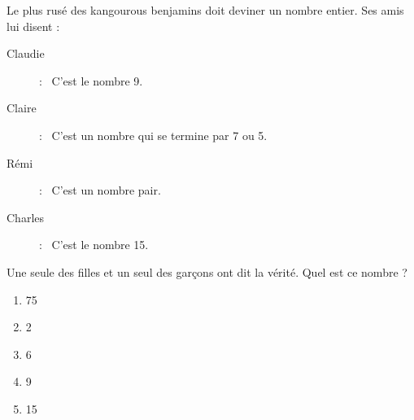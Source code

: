 Le plus rusé des kangourous benjamins doit deviner un nombre entier. Ses amis lui disent :
\begin{description}
\item[Claudie] : \og\ C'est le nombre 9.\fg
\item[Claire] : \og\ C'est un nombre qui se termine par 7 ou 5.\fg
\item[Rémi] : \og\ C'est un nombre pair.\fg
\item[Charles] : \og\ C'est le nombre 15.\fg
\end{description}
 Une seule des filles et un seul des garçons ont dit la vérité. Quel est ce nombre ?
 \begin{multicols}{5}
   \begin{enumerate}[A/]
   \item 75
   \item 2
   \item 6
   \item 9
   \item 15
   \end{enumerate}
 \end{multicols}
